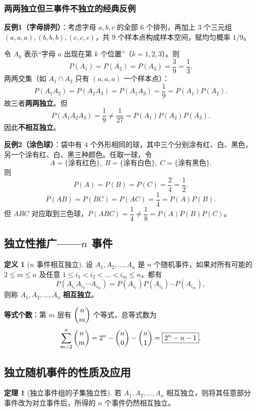 \documentclass[11pt,a4paper]{report}
\theoremstyle{definition}
\newtheorem{definition}{定义}[chapter]
\newtheorem{theorem}{定理}[chapter]
\begin{document}
\subsubsection{两两独立但三事件不独立的经典反例}

\textbf{反例1（字母排列）}：考虑字母 $a,b,c$ 的全部 $6$ 个排列，再加上 $3$ 个三元组 $(a,a,a), (b,b,b), (c,c,c)$，共 $9$ 个样本点构成样本空间，赋均匀概率 $1/9$。

令 $A_k$ 表示``字母 $a$ 出现在第 $k$ 个位置''（$k=1,2,3$）。则
\[
P(A_1) = P(A_2) = P(A_3) = \frac{3}{9} = \frac{1}{3}.
\]
两两交集（如 $A_1 \cap A_2$ 只有 $(a,a,a)$ 一个样本点）：
\[
P(A_1A_2) = P(A_2A_3) = P(A_1A_3) = \frac{1}{9} = P(A_1)P(A_2).
\]
故三者\textbf{两两独立}。但
\[
P(A_1A_2A_3) = \frac{1}{9} \neq \frac{1}{27} = P(A_1)P(A_2)P(A_3).
\]
因此\textbf{不相互独立}。

\textbf{反例2（涂色球）}：袋中有 $4$ 个外形相同的球，其中三个分别涂有红、白、黑色，另一个涂有红、白、黑三种颜色。任取一球，令
\[
A = \{\text{涂有红色}\},\; B = \{\text{涂有白色}\},\; C = \{\text{涂有黑色}\}.
\]
则
\[
P(A) = P(B) = P(C) = \frac{2}{4} = \frac{1}{2}.
\]
\[
P(AB) = P(BC) = P(AC) = \frac{1}{4} = P(A)P(B).
\]
但 $ABC$ 对应取到三色球，$P(ABC) = \dfrac{1}{4} \neq \dfrac{1}{8} = P(A)P(B)P(C)$。

\subsection{独立性推广——\texorpdfstring{$n$}{n} 事件}

\begin{definition}[$n$ 事件相互独立]
设 $A_1, A_2, \dots, A_n$ 是 $n$ 个随机事件，如果对所有可能的 $2 \leq m \leq n$ 及任意 $1 \leq i_1 < i_2 < \dots < i_m \leq n$，都有
\[
P(A_{i_1}A_{i_2}\cdots A_{i_m}) = P(A_{i_1})P(A_{i_2})\cdots P(A_{i_m}),
\]
则称 $A_1, A_2, \dots, A_n$ \textbf{相互独立}。
\end{definition}

\textbf{等式个数}：第 $m$ 层有 $\dbinom{n}{m}$ 个等式，总等式数为
\[
\sum_{m=2}^{n} \dbinom{n}{m} = 2^n - \dbinom{n}{0} - \dbinom{n}{1} = \boxed{2^n - n - 1}.
\]

\subsection{独立随机事件的性质及应用}

\begin{theorem}[独立事件组的子集独立性]
若 $A_1, A_2, \dots, A_n$ 相互独立，则将其任意部分事件改为对立事件后，所得的 $n$ 个事件仍然相互独立。
\end{theorem}
\end{document}
